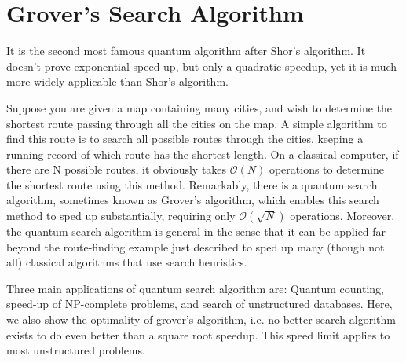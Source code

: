 \chapter{Grover's Search Algorithm}
It is the second most famous quantum algorithm after Shor's algorithm. It doesn't prove exponential speed up, but only a quadratic speedup, yet it is much more widely applicable than Shor's algorithm.

Suppose you are given a map containing many cities, and wish to determine the shortest route passing through all the cities on the map. A simple algorithm to find this route is to search all possible routes through the cities, keeping a running record of which route has the shortest length. On a classical computer, if there are N possible routes, it obviously takes $\mathcal{O}(N)$ operations to determine the shortest route using this method. Remarkably, there is a quantum search algorithm, sometimes known as Grover's algorithm, which enables this search method to sped up substantially, requiring only $\mathcal{O}(\sqrt{N})$ operations. Moreover, the quantum search algorithm is general in the sense that it can be applied far beyond the route-finding example just described to sped up many (though not all) classical algorithms that use search heuristics.

Three main applications of quantum search algorithm are: Quantum counting, speed-up of NP-complete problems, and search of unstructured databases. Here, we also show the optimality of grover's algorithm, i.e. no better search algorithm exists to do even better than a square root speedup. This speed limit applies to most unstructured problems.

